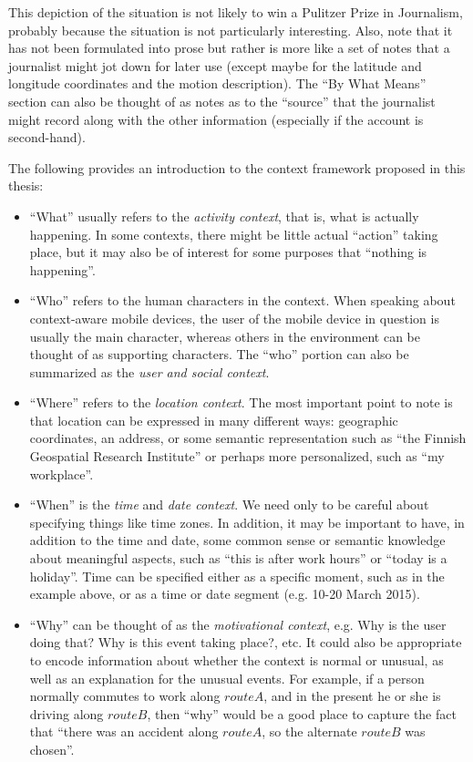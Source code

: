 This depiction of the situation is not likely to win a Pulitzer Prize in Journalism, probably because the situation is not particularly interesting. Also, note that it has not been formulated into prose but rather is more like a set of notes that a journalist might jot down for later use (except maybe for the latitude and longitude coordinates and the motion description). The ``By What Means'' section can also be thought of as notes as to the ``source'' that the journalist might record along with the other information (especially if the account is second-hand).

The following provides an introduction to the context framework proposed in this thesis:
%
\begin{itemize}
\item ``What'' usually refers to the \emph{activity context}, that is, what is actually happening. In some contexts, there might be little actual ``action'' taking place, but it may also be of interest for some purposes that ``nothing is happening''.
% 
\item ``Who'' refers to the human characters in the context. When speaking about context-aware mobile devices, the user of the mobile device in question is usually the main character, whereas others in the environment can be thought of as supporting characters. The ``who'' portion can also be summarized as the \emph{user and social context}. 
%
\item ``Where'' refers to the \emph{location context}. The most important point to note is that location can be expressed in many different ways: geographic coordinates, an address, or some semantic representation such as ``the Finnish Geospatial Research Institute'' or perhaps more personalized, such as ``my workplace''.
%
\item ``When'' is the \emph{time} and \emph{date context}. We need only to be careful about specifying things like time zones. In addition, it may be important to have, in addition to the time and date, some common sense or semantic knowledge about meaningful aspects, such as ``this is after work hours'' or ``today is a holiday''. Time can be specified either as a specific moment, such as in the example above, or as a time or date segment (e.g. 10-20 March 2015).
%
\item ``Why'' can be thought of as the \emph{motivational context}, e.g. Why is the user doing that? Why is this event taking place?, etc. It could also be appropriate to encode information about whether the context is normal or unusual, as well as an explanation for the unusual events. For example, if a person normally commutes to work along $route A$, and in the present he or she is driving along $route B$, then ``why'' would be a good place to capture the fact that ``there was an accident along $route A$, so the alternate $route B$ was chosen''.

\end{itemize}
